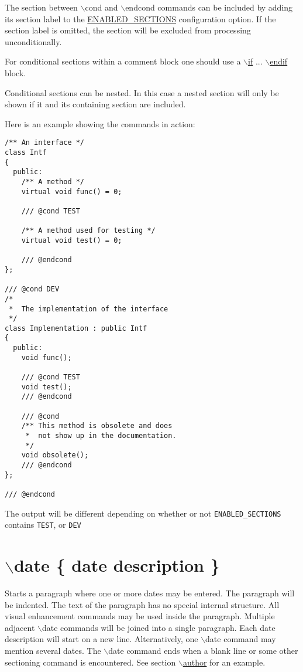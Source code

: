 The section between $\backslash$cond and $\backslash$endcond commands can be included by adding its section label to the \hyperlink{config_cfg_enabled_sections}{ENABLED\_\-SECTIONS} configuration option. If the section label is omitted, the section will be excluded from processing unconditionally.

For conditional sections within a comment block one should use a \hyperlink{commands_cmdif}{$\backslash$if} ... \hyperlink{commands_cmdendif}{$\backslash$endif} block.

Conditional sections can be nested. In this case a nested section will only be shown if it and its containing section are included.

Here is an example showing the commands in action:



\footnotesize\begin{verbatim}
/** An interface */
class Intf
{
  public:
    /** A method */
    virtual void func() = 0;

    /// @cond TEST

    /** A method used for testing */
    virtual void test() = 0;

    /// @endcond
};

/// @cond DEV
/*
 *  The implementation of the interface 
 */
class Implementation : public Intf
{
  public:
    void func();

    /// @cond TEST
    void test();
    /// @endcond

    /// @cond
    /** This method is obsolete and does
     *  not show up in the documentation.
     */
    void obsolete();
    /// @endcond
};

/// @endcond 
\end{verbatim}
\normalsize


The output will be different depending on whether or not {\tt ENABLED\_\-SECTIONS} contains {\tt TEST}, or {\tt DEV} 



 \hypertarget{commands_cmddate}{}\section{$\backslash$date \{ date description \}}\label{commands_cmddate}
 Starts a paragraph where one or more dates may be entered. The paragraph will be indented. The text of the paragraph has no special internal structure. All visual enhancement commands may be used inside the paragraph. Multiple adjacent $\backslash$date commands will be joined into a single paragraph. Each date description will start on a new line. Alternatively, one $\backslash$date command may mention several dates. The $\backslash$date command ends when a blank line or some other sectioning command is encountered. See section \hyperlink{commands_cmdauthor}{$\backslash$author} for an example.



